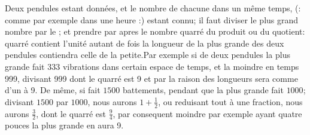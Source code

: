 	\vspace*{8mm}
	\pstart 
	\normalsize
	\noindent[56~r\textsuperscript{o}] Deux pendules\protect{}  estant donn\'{e}es, et le nombre  de chacune dans un m\^{e}me temps, (: comme par exemple dans une heure :) estant connu; il faut diviser le plus grand nombre par le ; et prendre par apres le nombre quarr\'{e} du produit ou du quotient: quarr\'{e} contient l'unit\'{e} autant de fois la longueur de la plus grande des deux pendules contiendra celle de la petite.\pend \pstart Par exemple si de deux pendules la plus grande fait 333 vibrations\protect{} dans  certain espace de temps, et la moindre en  temps 999, divisant 999  dont le quarr\'{e} est 9 et par  la raison des longueurs sera comme d'un \`{a} 9.\pend 
\pstart De m\^{e}me, si  fait $\displaystyle1500$ battements, pendant que la plus grande fait $\displaystyle1000$; divisant $\displaystyle1500$ par $\displaystyle1000$, nous aurons $\displaystyle1+\frac{1}{2}$, ou reduisant tout \`{a} une fraction, nous aurons $\displaystyle\frac{3}{2}$, dont le quarr\'{e} est $\displaystyle\frac{9}{4}$, par consequent  moindre par exemple ayant quatre pouces la plus grande en aura 9.\pend

